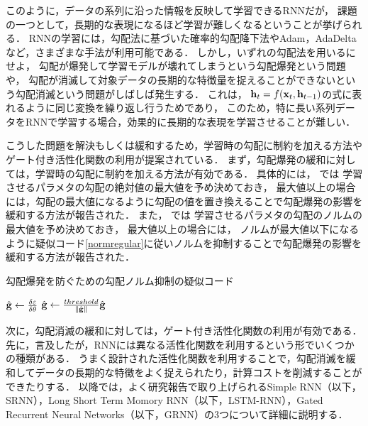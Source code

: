 このように，データの系列に沿った情報を反映して学習できるRNNだが，
課題の一つとして，長期的な表現になるほど学習が難しくなるということが挙げられる\cite{bengio1994learning}．
RNNの学習には，勾配法に基づいた確率的勾配降下法\cite{robbins1951stochastic,kushner2003stochastic}やAdam\cite{kingma2014adam}，AdaDelta\cite{zeiler2012adadelta}など，さまざまな手法が利用可能である．
しかし，いずれの勾配法を用いるにせよ，
勾配が爆発して学習モデルが壊れてしまうという勾配爆発\cite{bengio1994learning,pascanu2013difficulty}という問題や，
勾配が消滅して対象データの長期的な特徴量を捉えることができないという勾配消滅\cite{pascanu2013difficulty, hochreiter1998vanishing}という問題がしばしば発生する．
これは，
${\bf h}_t = f({\bf x}_t, {\bf h}_{t-1})$の式に表れるように同じ変換を繰り返し行うためであり，
このため，特に長い系列データをRNNで学習する場合，効果的に長期的な表現を学習させることが難しい．


こうした問題を解決もしくは緩和するため，学習時の勾配に制約を加える方法やゲート付き活性化関数の利用が提案されている．
まず，勾配爆発の緩和に対しては，学習時の勾配に制約を加える方法が有効である．
具体的には，
\cite{mikolov2012statistical}では
学習させるパラメタの勾配の絶対値の最大値を予め決めておき，
最大値以上の場合には，勾配の最大値になるように勾配の値を置き換えることで勾配爆発の影響を緩和する方法が報告された．
また，
\cite{pascanu2013difficulty}では
学習させるパラメタの勾配のノルムの最大値を予め決めておき，
最大値以上の場合には， ノルムが最大値以下になるように疑似コード\ref{normregular}に従いノルムを抑制することで勾配爆発の影響を緩和する方法が報告された．
\begin{algorithm}                      
\caption{勾配爆発を防ぐための勾配ノルム抑制の疑似コード}
\label{normregular}                          
\begin{algorithmic}                  
	\STATE $\hat{{\bf g}} \leftarrow \frac{\delta \varepsilon}{\delta {\bf \theta}}$
	\STATE $\hat{{\bf g}} \leftarrow \frac{threshold}{\Vert \hat{{\bf g}} \Vert} \hat{{\bf g}}$
	\ENDIF
\end{algorithmic}
\end{algorithm}


次に，勾配消滅の緩和に対しては，ゲート付き活性化関数の利用が有効である．
先に，言及したが，RNNには異なる活性化関数を利用するという形でいくつかの種類がある．
うまく設計された活性化関数を利用することで，勾配消滅を緩和してデータの長期的な特徴をよく捉えられたり，計算コストを削減することができたりする．
以降では，よく研究報告で取り上げられるSimple RNN（以下，SRNN）\cite{williams1989learning}，Long Short  Term Momory RNN（以下，LSTM-RNN）\cite{hochreiter1997long}，Gated Recurrent Neural Networks（以下，GRNN）\cite{cho2014learning}の3つについて詳細に説明する．



